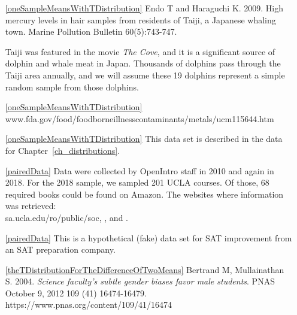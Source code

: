 
\begin{itemize}
\item[\ref{oneSampleMeansWithTDistribution}]
    Endo T and Haraguchi K. 2009.
    High mercury levels in hair samples from residents of Taiji,
    a Japanese whaling town.
    Marine Pollution Bulletin 60(5):743-747.

    Taiji was featured in the movie
    \emph{The Cove}, and it is a significant source of dolphin
    and whale meat in Japan.
    Thousands of dolphins pass through the Taiji area annually,
    and we will assume these 19 dolphins represent a simple
    random sample from those dolphins.
\item[\ref{oneSampleMeansWithTDistribution}]
        {www.fda.gov/food/foodborneillnesscontaminants/metals/ucm115644.htm}

\item[\ref{oneSampleMeansWithTDistribution}]
    This data set is described in
    the data for Chapter~\ref{ch_distributions}.

\item[\ref{pairedData}]
    Data were collected by OpenIntro staff in 2010 and again
    in 2018.
    For the 2018 sample, we sampled 201 UCLA courses.
    Of those, 68 required books could be
    found on Amazon.
    The websites where information was retrieved: \\
        {sa.ucla.edu/ro/public/soc},
    ,
    and .

\item[\ref{pairedData}]
    This is a hypothetical (fake) data set for SAT improvement from
    an SAT preparation company.

\item[\ref{theTDistributionForTheDifferenceOfTwoMeans}]
    Bertrand M, Mullainathan S. 2004.
    \emph{Science faculty's subtle gender biases favor male students}.
    PNAS October 9, 2012 109 (41) 16474-16479.\\
        {https://www.pnas.org/content/109/41/16474}


\end{itemize}
